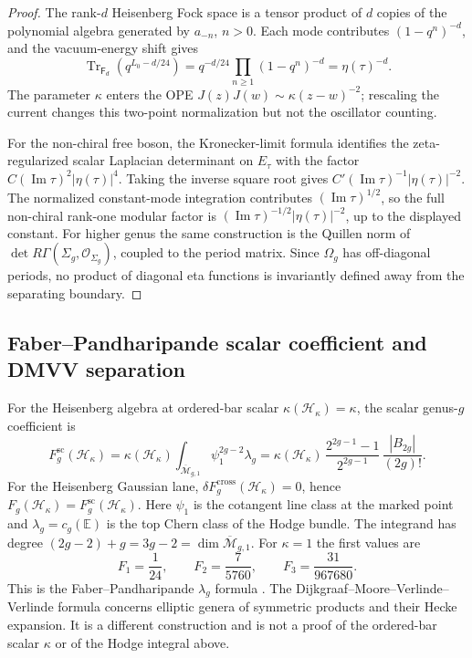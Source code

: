 \begin{proof}
The rank-$d$ Heisenberg Fock space is a tensor product of $d$ copies of
the polynomial algebra generated by $a_{-n}$, $n>0$. Each mode
contributes $(1-q^n)^{-d}$, and the vacuum-energy shift gives
\[
\operatorname{Tr}_{\mathsf F_d}\!\left(q^{L_0-d/24}\right)
=q^{-d/24}\prod_{n\ge1}(1-q^n)^{-d}
=\eta(\tau)^{-d}.
\]
The parameter $\kappa$ enters the OPE
$J(z)J(w)\sim \kappa(z-w)^{-2}$; rescaling the current changes this
two-point normalization but not the oscillator counting.

For the non-chiral free boson, the Kronecker-limit formula identifies
the zeta-regularized scalar Laplacian determinant on $E_\tau$ with
the factor
$C(\operatorname{Im}\tau)^2|\eta(\tau)|^4$.  Taking the inverse square
root gives
$C'(\operatorname{Im}\tau)^{-1}|\eta(\tau)|^{-2}$. The normalized
constant-mode integration contributes
$(\operatorname{Im}\tau)^{1/2}$, so the full non-chiral rank-one
modular factor is
$(\operatorname{Im}\tau)^{-1/2}|\eta(\tau)|^{-2}$, up to the displayed
constant. For higher genus the same construction is the Quillen norm
of $\det R\Gamma(\Sigma_g,\mathcal O_{\Sigma_g})$, coupled to the
period matrix. Since $\Omega_g$ has off-diagonal periods, no product
of diagonal eta functions is invariantly defined away from the
separating boundary.
\end{proof}

\subsection{Faber--Pandharipande scalar coefficient and DMVV separation}
\label{subsec:physics-comparison}

\begin{theorem}\label{thm:dmvv-agreement}
For the Heisenberg algebra at ordered-bar scalar
$\kappa(\mathcal H_\kappa)=\kappa$, the scalar genus-$g$ coefficient
is
\begin{equation}
F_g^{\mathrm{sc}}(\mathcal H_\kappa)
=\kappa(\mathcal H_\kappa)
\int_{\overline{\mathcal M}_{g,1}}\psi_1^{2g-2}\lambda_g
=\kappa(\mathcal H_\kappa)\,
\frac{2^{2g-1}-1}{2^{2g-1}}\,
\frac{|B_{2g}|}{(2g)!}.
\end{equation}
For the Heisenberg Gaussian lane,
$\delta F_g^{\mathrm{cross}}(\mathcal H_\kappa)=0$, hence
$F_g(\mathcal H_\kappa)=F_g^{\mathrm{sc}}(\mathcal H_\kappa)$.
Here $\psi_1$ is the cotangent line class at the marked point and
$\lambda_g=c_g(\mathbb E)$ is the top Chern class of the Hodge bundle.
The integrand has degree $(2g-2)+g=3g-2=\dim\overline{\mathcal M}_{g,1}$.
For $\kappa=1$ the first values are
\begin{equation}
F_1=\frac1{24},\qquad
F_2=\frac7{5760},\qquad
F_3=\frac{31}{967680}.
\end{equation}
This is the Faber--Pandharipande $\lambda_g$ formula \cite{FP03}.
The Dijkgraaf--Moore--Verlinde--Verlinde formula \cite{DMVV} concerns
elliptic genera of symmetric products and their Hecke expansion. It is
a different construction and is not a proof of the ordered-bar scalar
$\kappa$ or of the Hodge integral above.
\end{theorem}

